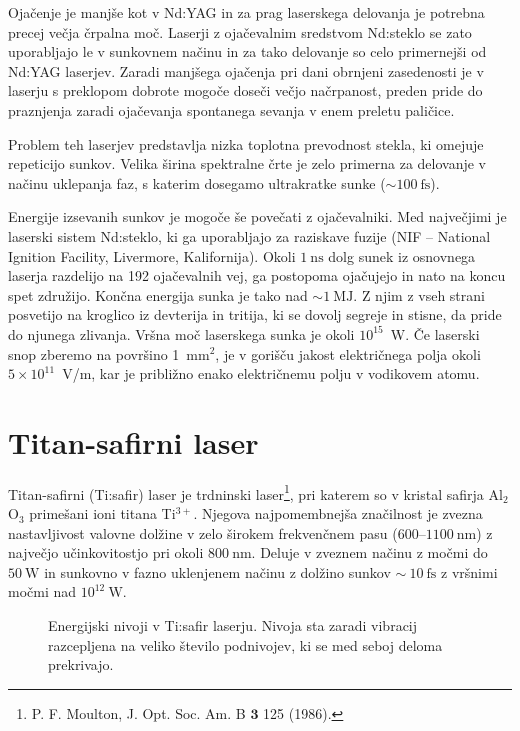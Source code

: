 Ojačenje je manjše kot v Nd:YAG in za prag laserskega delovanja je
potrebna precej večja črpalna moč. Laserji z ojačevalnim sredstvom 
Nd:steklo se zato uporabljajo le v 
sunkovnem načinu in za tako delovanje so celo primernejši od Nd:YAG laserjev.
Zaradi manjšega ojačenja pri dani obrnjeni zasedenosti 
je v laserju s preklopom dobrote mogoče doseči večjo načrpanost, 
preden pride do praznjenja
zaradi ojačevanja spontanega sevanja v enem preletu paličice. 

Problem teh laserjev
predstavlja nizka toplotna prevodnost stekla, ki omejuje repeticijo sunkov.
Velika širina spektralne črte je zelo primerna za delovanje v načinu uklepanja faz, s 
katerim dosegamo ultrakratke sunke ($\sim 100~\si{\femto\second}$). 

\begin{remark}
Energije izsevanih sunkov je mogoče še povečati z ojačevalniki. Med največjimi je
laserski sistem Nd:steklo, ki ga uporabljajo za raziskave fuzije (NIF -- National Ignition Facility, 
Livermore, Kalifornija).
Okoli $1~\si{\nano\second}$ dolg sunek iz osnovnega laserja razdelijo na 192
ojačevalnih vej, ga postopoma ojačujejo in nato na koncu spet združijo.
Končna energija sunka je tako nad $\sim 1~\si{\mega\joule}$. Z njim z vseh strani posvetijo na
kroglico iz devterija in tritija, ki se dovolj segreje in stisne, da pride do 
njunega zlivanja. Vršna moč laserskega sunka je okoli $10^{15}$~W. 
Če laserski snop zberemo na površino 1~mm$^2$, je v gorišču jakost električnega polja
okoli $5 \times 10^{11}$~V/m, kar je približno enako električnemu polju v vodikovem atomu.
\end{remark}

\section{Titan-safirni laser}
Titan-safirni (Ti:safir) 
laser je trdninski laser\footnote{P. F. Moulton, J. Opt. Soc. Am. B $\mathbf{3}$
125 (1986).}, pri katerem so v kristal safirja
Al$_2$O$_3$ primešani ioni titana Ti$^{3+}$. Njegova najpomembnejša značilnost je
zvezna nastavljivost valovne dolžine v zelo širokem frekvenčnem pasu 
($600$--$1100~\si{\nano\metre}$) z največjo učinkovitostjo pri okoli $800~\si{\nano\metre}$. Deluje
v zveznem načinu z močmi do $50~\si{\watt}$ in sunkovno  v fazno uklenjenem načinu 
z dolžino sunkov $\sim~10~\si{\femto\second}$ z vršnimi močmi nad $10^{12}~\si{\watt}$. 
\begin{figure}[ht]
\centering
\def\svgwidth{70truemm} 

\caption{Energijski nivoji v Ti:safir laserju. Nivoja sta zaradi vibracij
razcepljena na veliko število podnivojev, ki se med seboj deloma prekrivajo.
}
\label{fig:TiE}
\end{figure} 

